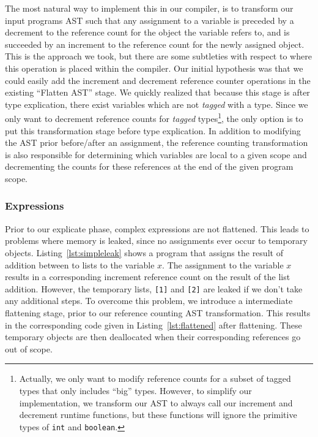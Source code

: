 \documentclass{sigplanconf}
\newcommand{\avariable}[1]{\ensuremath{#1}}
\newcommand{\aliteral}[1]{\texttt{#1}}
\newcommand{\atype}[1]{\texttt{#1}}
\begin{document}
The most natural way to implement this in our compiler, is to transform our input programs AST such that any assignment to a variable is preceded by a decrement to the reference count for the object the variable refers to, and is succeeded by an increment to the reference count for the newly assigned object.  This is the approach we took, but there are some subtleties with respect to where this operation is placed within the compiler.  Our initial hypothesis was that we could easily add the increment and decrement reference counter operations in the existing ``Flatten AST'' stage.  We quickly realized that because this stage is after type explication, there exist variables which are not \textit{tagged} with a type.  Since we only want to decrement reference counts for \textit{tagged} types\footnote{Actually, we only want to modify reference counts for a subset of tagged types that only includes ``big'' types. However, to simplify our implementation, we transform our AST to always call our increment and decrement runtime functions, but these functions will ignore the primitive types of \atype{int} and \atype{boolean}.}, the only option is to put this transformation stage before type explication.  In addition to modifying the AST prior before/after an assignment, the reference counting transformation is also responsible for determining which variables are local to a given scope and decrementing the counts for these references at the end of the given program scope.

\subsubsection{Expressions}
Prior to our explicate phase, complex expressions are not flattened.  This leads to problems where memory is leaked, since no assignments ever occur to temporary objects.  Listing~\ref{lst:simpleleak} shows a program that assigns the result of addition between to lists to the variable \avariable{x}.  The assignment to the variable \avariable{x} results in a corresponding increment reference count on the result of the list addition.  However, the temporary lists, \aliteral{[1]} and \aliteral{[2]} are leaked if we don't take any additional steps.  To overcome this problem, we introduce a intermediate flattening stage, prior to our reference counting AST transformation.   This results in the corresponding code given in Listing~\ref{lst:flattened} after flattening.  These temporary objects are then deallocated when their corresponding references go out of scope.
\end{document}
